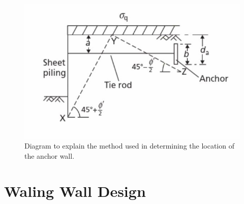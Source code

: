 \documentclass[12pt, a4paper]{article}
\begin{document}
\begin{figure}[H]
  \centering
  	\includegraphics[width=0.5\textheight]{pilinghandbooktie}
   	\caption{Diagram to explain the method used in determining the location of the anchor wall. \cite{e}}
	\label{anchor}
\end{figure}

\section{Waling Wall Design}
\end{document}
